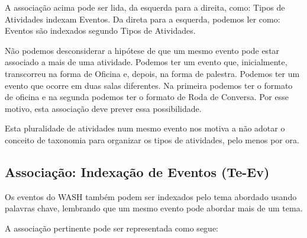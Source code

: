 \documentclass[
12pt,		%
openright,	%
twoside,  %
a4paper,			%
chapter=TITLE,		%
english,			%
french,				%
spanish,			%
brazil				%
]{USPSC-classe/USPSC}
\begin{document}
A associa\c{c}\~ao acima pode ser lida, da esquerda para a direita, como: \textquotedbl Tipos de Atividades indexam Eventos\textquotedbl . Da direta para a esquerda, podemos ler como: \textquotedbl Eventos s\~ao indexados segundo Tipos de Atividades\textquotedbl .









N\~ao podemos desconsiderar a hip\'otese de que um mesmo evento pode estar associado a mais de uma atividade. Podemos ter um evento que, inicialmente, transcorreu na forma de Oficina e, depois, na forma de palestra. Podemos ter um evento que ocorre em duas salas diferentes. Na primeira podemos ter o formato de oficina e na segunda podemos ter o formato de Roda de Conversa. Por esse motivo, esta associa\c{c}\~ao deve prever essa possibilidade.









Esta pluralidade de atividades num mesmo evento nos motiva a n\~ao adotar o conceito de taxonomia para organizar os tipos de atividades, pelo menos por ora.









\subsection[Associa\c{c}\~ao: Indexa\c{c}\~ao de Eventos (Te-Ev)]{Associa\c{c}\~ao: Indexa\c{c}\~ao de Eventos (Te-Ev)}\label{Associa\c{c}\~ao: Indexa\c{c}\~ao de Eventos (Te-Ev)}
Os eventos do WASH tamb\'em podem ser indexados pelo tema abordado usando palavras chave, lembrando que um mesmo evento pode abordar mais de um tema.









A associa\c{c}\~ao pertinente pode ser representada como segue:










\end{document}
